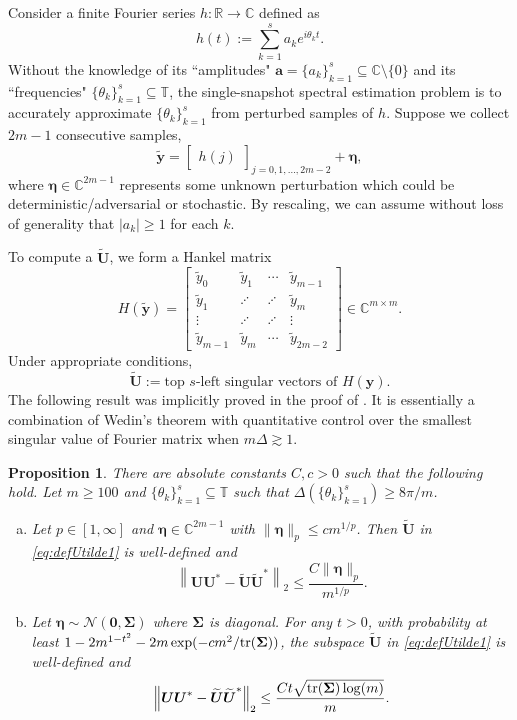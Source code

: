 \documentclass[11pt]{article}
\newtheorem{proposition}[theorem]{Proposition}
\theoremstyle{definition}
\numberwithin{theorem}{section}
\numberwithin{equation}{section}
\def\C{\mathbb{C}}
\def\R{\mathbb{R}}
\def\T{\mathbb{T}}
\renewcommand{\subset}{\subseteq}
\renewcommand{\tilde}{\widetilde}
\def\tr{{\rm tr}}
\newcommand{\bfa}{{\boldsymbol a}}
\newcommand{\bfy}{{\boldsymbol y}}
\newcommand{\bfU}{{\boldsymbol U}}
\newcommand{\bfzero}{{\boldsymbol 0}}
\newcommand{\bfeta}{{\boldsymbol \eta}}
\newcommand{\bfSigma}{{\boldsymbol \Sigma}}
\newcommand{\calN}{\mathcal{N}}
\numberwithin{equation}{section}
\begin{document}
Consider a finite Fourier series $h\colon\R\to\C$ defined as
\begin{equation}
	\label{eq:hdef}
	h(t):= \sum_{k=1}^s a_k e^{i\theta_k t}. 
\end{equation}
Without the knowledge of its ``amplitudes" $\bfa=\{a_k\}_{k=1}^s\subset\C\setminus \{0\}$ and its ``frequencies" $\{\theta_k\}_{k=1}^s\subset \T$, the single-snapshot spectral estimation problem is to accurately approximate $\{\theta_k\}_{k=1}^s$ from perturbed samples of $h$. Suppose we collect $2m-1$ consecutive samples,
$$
\tilde \bfy = \begin{bmatrix} h(j) \end{bmatrix}_{j=0,1,\dots,2m-2}+\bfeta, 
$$
where $\bfeta\in \C^{2m-1}$ represents some unknown perturbation which could be deterministic/adversarial or stochastic. By rescaling, we can assume without loss of generality that $|a_k|\geq 1$ for each $k$. 

To compute a $\tilde\bfU$, we form a Hankel matrix
$$
H(\tilde \bfy)
=\begin{bmatrix}
    \tilde y_0 &\tilde y_1 &\cdots &\tilde y_{m-1} \\
    \tilde y_1 &\iddots &\iddots &\tilde y_{m} \\
    \vdots &\iddots &\iddots &\vdots \\
    \tilde y_{m-1} &\tilde y_m &\cdots &\tilde y_{2m-2} 
\end{bmatrix} \in \C^{m\times m}. 
$$
Under appropriate conditions,
\begin{equation}
    \label{eq:defUtilde1}
    \tilde \bfU:= \text{top $s$-left singular vectors of } H(\bfy).
\end{equation}
The following result was implicitly proved in the proof of \cite[Theorems 4.1 and 4.2]{fannjiang2025optimality}. It is essentially a combination of Wedin's theorem with quantitative control over the smallest singular value of Fourier matrix \cite{aubel2019vandermonde} when $m\Delta \gtrsim 1$. 

\begin{proposition}
    There are absolute constants $C,c>0$  such that the following hold. Let $m\geq 100$ and $\{\theta_k\}_{k=1}^s\subset\T$ such that $\Delta(\{\theta_k\}_{k=1}^s)\geq 8\pi/m$. 
    \begin{enumerate}[(a)]
        \item 
        Let $p\in [1,\infty]$ and $\bfeta\in \C^{2m-1}$ with $\|\bfeta\|_p\leq c m^{1/p}$. Then $\tilde \bfU$ in \eqref{eq:defUtilde1} is well-defined and 
        $$
        \left\|\bfU \bfU^* - \tilde \bfU\tilde \bfU^*\right\|_2
        \leq \frac{C \|\bfeta\|_p}{m^{1/p}}. 
        $$
        \item 
        Let $\bfeta\sim \calN(\bfzero, \bfSigma)$ where $\bfSigma$ is diagonal. For any $t>0$, with probability at least $1-2m^{1-t^2}-2m\exp(-c m^2/\tr(\bfSigma))$, the subspace $\tilde\bfU$ in \eqref{eq:defUtilde1} is well-defined and 
        $$
        \left\|\bfU \bfU^* - \tilde \bfU\tilde \bfU^* \right\|_2
        \leq \frac{C t \sqrt{\tr(\bfSigma) \log(m)}}{m}. 
        $$
    \end{enumerate}
    \label{prop:subspace1}
\end{proposition}
\end{document}
